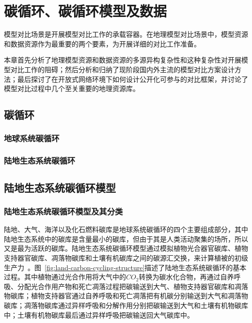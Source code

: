 \chapter{碳循环、碳循环模型及数据}
\label{chap:model}

模型对比场景是开展模型对比工作的承载容器。在地理模型对比场景中，模型资源和数据资源作为最重要的两个要素，为开展详细的对比工作准备。

本章首先分析了地理模型资源和数据资源的多源异构复杂性和这种复杂性对开展模型对比工作的阻碍；然后分析和归纳了现阶段国内外主流的模型对比方案设计方法；最后探讨了在开放式网络环境下如何设计公开化可参与的对比框架，并讨论了模型对比过程中几个至关重要的地理资源库。

\section{碳循环}
\subsection{地球系统碳循环}
\subsection{陆地生态系统碳循环}

\section{陆地生态系统碳循环模型}
\label{sec:model}
\subsection{陆地生态系统碳循环模型及其分类}

陆地、大气、海洋以及化石燃料碳库是地球系统碳循环的四个主要组成部分，其中陆地生态系统中的碳库是含量最小的碳库，但由于其是人类活动聚集的场所，所以又是最为活跃的碳库。陆地生态系统碳循环模型通过模拟植物光合器官碳库、植物支持器官碳库、凋落物碳库和土壤有机碳库之间的碳源汇交换，来计算植被的初级生产力~\cite{毛留喜2006陆地生态系统碳循环模型研究概述}。图~\ref{fig:land-carbon-cycling-structure}描述了陆地生态系统碳循环的基本过程。其中植物通过光合作用将大气中的$CO_2$转换为碳水化合物，再通过自养呼吸、分配光合作用产物和死亡凋落过程把碳输送到大气、植物支持器官碳库和凋落物碳库；植物支持器官通过自养呼吸和死亡凋落把有机碳分别输送到大气和凋落物碳库；凋落物碳库通过异样呼吸和分解作用分别把碳输送到大气和土壤有机物碳库中；土壤有机物碳库最后通过异样呼吸把碳输送回大气碳库中。


